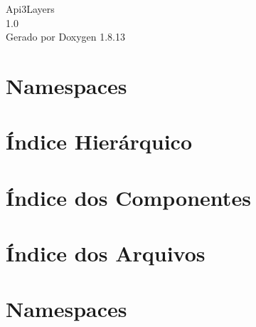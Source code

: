 \documentclass[twoside]{book}
\newcommand{\+}{\discretionary{\mbox{\scriptsize$\hookleftarrow$}}{}{}}
\newcommand{\clearemptydoublepage}{%
  \newpage{\pagestyle{empty}\cleardoublepage}%
}
\begin{document}
\hypersetup{pageanchor=false,
             bookmarksnumbered=true,
             pdfencoding=unicode
            }
\begin{titlepage}
\vspace*{7cm}
\begin{center}%
{\Large Api3\+Layers \\[1ex]\large 1.\+0 }\\
\vspace*{1cm}
{\large Gerado por Doxygen 1.8.13}\\
\end{center}
\end{titlepage}
\clearemptydoublepage
{}
\tableofcontents
\clearemptydoublepage
{}
\hypersetup{pageanchor=true}

\chapter{Namespaces}

\chapter{Índice Hierárquico}

\chapter{Índice dos Componentes}

\chapter{Índice dos Arquivos}

\chapter{Namespaces}










\end{document}
